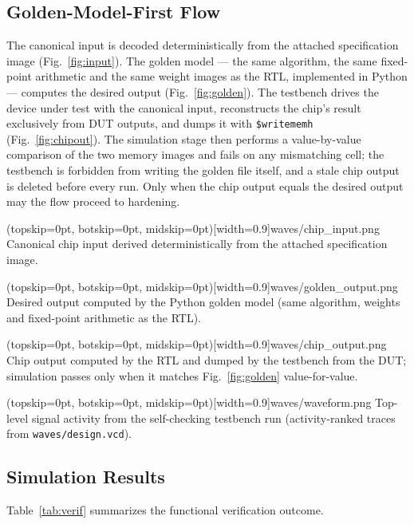 \documentclass{ieeeaccess}
\begin{document}
\subsection{Golden-Model-First Flow}
The canonical input is decoded deterministically from the attached specification image (Fig.~\ref{fig:input}). The golden model --- the same algorithm, the same fixed-point arithmetic and the same weight images as the RTL, implemented in Python --- computes the desired output (Fig.~\ref{fig:golden}). The testbench drives the device under test with the canonical input, reconstructs the chip's result exclusively from DUT outputs, and dumps it with \texttt{\$writememh} (Fig.~\ref{fig:chipout}). The simulation stage then performs a value-by-value comparison of the two memory images and fails on any mismatching cell; the testbench is forbidden from writing the golden file itself, and a stale chip output is deleted before every run. Only when the chip output equals the desired output may the flow proceed to hardening.

\Figure[!t](topskip=0pt, botskip=0pt, midskip=0pt)[width=0.9\columnwidth]{waves/chip_input.png}
{Canonical chip input derived deterministically from the attached specification image.\label{fig:input}}

\Figure[!t](topskip=0pt, botskip=0pt, midskip=0pt)[width=0.9\columnwidth]{waves/golden_output.png}
{Desired output computed by the Python golden model (same algorithm, weights and fixed-point arithmetic as the RTL).\label{fig:golden}}

\Figure[!t](topskip=0pt, botskip=0pt, midskip=0pt)[width=0.9\columnwidth]{waves/chip_output.png}
{Chip output computed by the RTL and dumped by the testbench from the DUT; simulation passes only when it matches Fig.~\ref{fig:golden} value-for-value.\label{fig:chipout}}

\Figure[!t](topskip=0pt, botskip=0pt, midskip=0pt)[width=0.9\columnwidth]{waves/waveform.png}
{Top-level signal activity from the self-checking testbench run (activity-ranked traces from \texttt{waves/design.vcd}).\label{fig:waves}}

\subsection{Simulation Results}
Table~\ref{tab:verif} summarizes the functional verification outcome.
\end{document}

